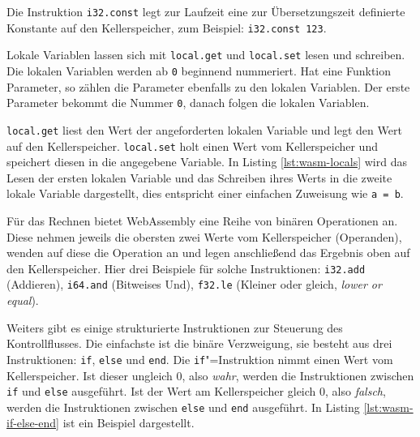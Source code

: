 Die Instruktion \lstinline{i32.const} legt zur Laufzeit eine zur Übersetzungszeit definierte Konstante auf den Kellerspeicher, zum Beispiel: \lstinline{i32.const 123}.

Lokale Variablen lassen sich mit \lstinline{local.get} und \lstinline{local.set} lesen und schreiben. Die lokalen Variablen werden ab \lstinline{0} beginnend nummeriert. Hat eine Funktion Parameter, so zählen die Parameter ebenfalls zu den lokalen Variablen. Der erste Parameter bekommt die Nummer \lstinline{0}, danach folgen die lokalen Variablen.

\lstinline{local.get} liest den Wert der angeforderten lokalen Variable und legt den Wert auf den Kellerspeicher. \lstinline{local.set} holt einen Wert vom Kellerspeicher und speichert diesen in die angegebene Variable. In Listing \ref{lst:wasm-locals} wird das Lesen der ersten lokalen Variable und das Schreiben ihres Werts in die zweite lokale Variable dargestellt, dies entspricht einer einfachen Zuweisung wie \lstinline{a = b}. 



Für das Rechnen bietet WebAssembly eine Reihe von binären Operationen an. Diese nehmen jeweils die obersten zwei Werte vom Kellerspeicher (Operanden), wenden auf diese die Operation an und legen anschließend das Ergebnis oben auf den Kellerspeicher. Hier drei Beispiele für solche Instruktionen: \lstinline{i32.add} (Addieren), \lstinline{i64.and} (Bitweises Und), \lstinline{f32.le} (Kleiner oder gleich, \emph{lower or equal}).

Weiters gibt es einige strukturierte Instruktionen zur Steuerung des Kontrollflusses. Die einfachste ist die binäre Verzweigung, sie besteht aus drei Instruktionen: \lstinline{if}, \lstinline{else} und \lstinline{end}. Die \lstinline{if}"=Instruktion nimmt einen Wert vom Kellerspeicher. Ist dieser ungleich 0, also \emph{wahr}, werden die Instruktionen zwischen \lstinline{if} und \lstinline{else} ausgeführt. Ist der Wert am Kellerspeicher gleich 0, also \emph{falsch}, werden die Instruktionen zwischen \lstinline{else} und \lstinline{end} ausgeführt. In Listing \ref{lst:wasm-if-else-end} ist ein Beispiel dargestellt.



